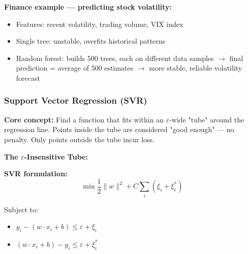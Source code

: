 \documentclass[12pt,openany]{book}
\begin{document}
\textbf{Finance example --- predicting stock volatility:}
\begin{itemize}[leftmargin=*]
    \item Features: recent volatility, trading volume, VIX index
    \item Single tree: unstable, overfits historical patterns
    \item Random forest: builds 500 trees, each on different data samples \(\rightarrow\) final prediction = average of 500 estimates \(\rightarrow\) more stable, reliable volatility forecast

\end{itemize}

\medskip


\subsubsection{Support Vector Regression (SVR)}


\textbf{Core concept:} Find a function that fits within an \(\varepsilon\)-wide "tube" around the regression line. Points inside the tube are considered "good enough" --- no penalty. Only points outside the tube incur loss.

\textbf{The \(\varepsilon\)-Insensitive Tube:}


\begin{center}
\end{center}



\textbf{SVR formulation:}
\[
\min \frac{1}{2}\|w\|^2 + C\sum_{i}(\xi_i + \xi_i^*)
\]


Subject to:
\begin{itemize}[leftmargin=*]
    \item \(y_i - (w \cdot x_i + b) \leq \varepsilon + \xi_i\)
    \item \((w \cdot x_i + b) - y_i \leq \varepsilon + \xi_i^*\)

\end{itemize}
\end{document}
